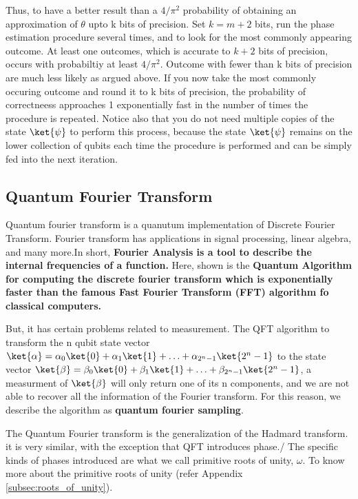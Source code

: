 \documentclass[12pt, oneside]{book}
\theoremstyle{definition}
\theoremstyle{definition}
\theoremstyle{remark}
\begin{document}
Thus, to have a better result than a $4/\pi^2$ probability of obtaining an approximation of $\theta$ upto k bits of precision.
Set $k=m+2$ bits, run the phase estimation procedure several times, and to look for the most commonly appearing outcome. At least one outcomes, which is accurate to $k+2$ bits of precision, 
occurs with probabiltiy at least $4/\pi^2$. Outcome with fewer than k bits of precision are much less likely as argued above.
If you now take the most commonly occuring outcome and round it to k bits of precision, the probability of correctneess approaches 1 exponentially fast in the number of times the procedure is repeated. 
Notice also that you do not need multiple copies of the state $\ket{\psi}$ to perform this process, because the state $\ket{\psi}$ remains on the lower collection of qubits each time the procedure is performed
and can be simply fed into the next iteration.


















\subsection{Quantum Fourier Transform}
Quantum fourier transform is a quanutum implementation of Discrete Fourier Transform.
Fourier transform has applications in signal processing, linear algebra, and many more.In short, 
\textbf{Fourier Analysis is a tool to describe the internal frequencies of a function.}
Here, shown is the \textbf{Quantum Algorithm for computing the discrete fourier transform 
which is exponentially faster than the famous Fast Fourier Transform (FFT) algorithm 
fo classical computers.}

But, it has certain problems related to measurement. The QFT algorithm to transform the n qubit state vector 
$\ket{\alpha}=\alpha_0\ket{0}+\alpha_1\ket{1}+\ldots+\alpha_{2^n-1}\ket{2^n-1}$ to the state vector
$\ket{\beta}=\beta_0\ket{0}+\beta_1\ket{1}+\ldots+\beta_{2^n-1}\ket{2^n-1}$, a measurment of $\ket{\beta}$ 
will only return one of its n components, and we are not able to recover all the information of the Fourier transform.
For this reason, we describe the algorithm as \textbf{quantum fourier sampling}.

The Quantum Fourier transform is the generalization of the Hadmard transform. it is very similar, with the exception that QFT introduces phase./
The specific kinds of phases introduced are what we call primitive roots of unity, $\omega$.
To know more about the primitive roots of unity (refer Appendix \ref{subsec:roots_of_unity}).
\end{document}
